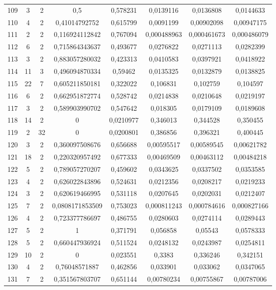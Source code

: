 \begin{longtable}{|c|c|c|c|c|c|c|c|}
109 & 3 & 2 & 0,5 & 0,578231 & 0,0139116 & 0,0136808 & 0,0144633  \\
110 & 4 & 2 & 0,41014792752 & 0,615799 & 0,0091199 & 0,00902098 & 0,00947175  \\
111 & 2 & 2 & 0,116924112842 & 0,767094 & 0,000488963 & 0,000461673 & 0,000486079  \\
112 & 6 & 2 & 0,715864343637 & 0,493677 & 0,0276822 & 0,0271113 & 0,0282399  \\
113 & 3 & 2 & 0,883057280032 & 0,423313 & 0,0410583 & 0,0397921 & 0,0418922  \\
114 & 11 & 3 & 0,496094870334 & 0,59462 & 0,0135325 & 0,0132879 & 0,0138825  \\
115 & 22 & 7 & 0,605211850181 & 0,322022 & 0,106831 & 0,102759 & 0,104597  \\
116 & 6 & 2 & 0,662951872774 & 0,528742 & 0,0214838 & 0,0210648 & 0,0219197  \\
117 & 3 & 2 & 0,589903990702 & 0,547642 & 0,018305 & 0,0179109 & 0,0189608  \\
118 & 14 & 2 & 0 & 0,0210977 & 0,346013 & 0,344528 & 0,350455  \\
119 & 2 & 32 & 0 & 0,0200801 & 0,386856 & 0,396321 & 0,400445  \\
120 & 3 & 2 & 0,360097508676 & 0,656688 & 0,00595517 & 0,00589545 & 0,00621782  \\
121 & 18 & 2 & 0,220320957492 & 0,677333 & 0,00469509 & 0,00463112 & 0,00484218  \\
122 & 5 & 2 & 0,789057270207 & 0,459602 & 0,0343625 & 0,0337502 & 0,0353585  \\
123 & 4 & 2 & 0,626022843896 & 0,524631 & 0,0212356 & 0,0208217 & 0,0219233  \\
124 & 3 & 2 & 0,620619466995 & 0,531118 & 0,0207645 & 0,0202031 & 0,0212407  \\
125 & 7 & 2 & 0,0808171853509 & 0,753023 & 0,000811243 & 0,000784616 & 0,000827166  \\
126 & 4 & 2 & 0,723377786697 & 0,486755 & 0,0280603 & 0,0274114 & 0,0289443  \\
127 & 5 & 2 & 1 & 0,371791 & 0,056858 & 0,05543 & 0,0578333  \\
128 & 5 & 2 & 0,660447936924 & 0,511524 & 0,0248132 & 0,0243987 & 0,0254811  \\
129 & 10 & 2 & 0 & 0,023551 & 0,3383 & 0,336246 & 0,342151  \\
130 & 4 & 2 & 0,76048571887 & 0,462856 & 0,033901 & 0,033062 & 0,0347065  \\
131 & 7 & 2 & 0,351567803707 & 0,651144 & 0,00780234 & 0,00755867 & 0,00787006  \\

\end{longtable}

